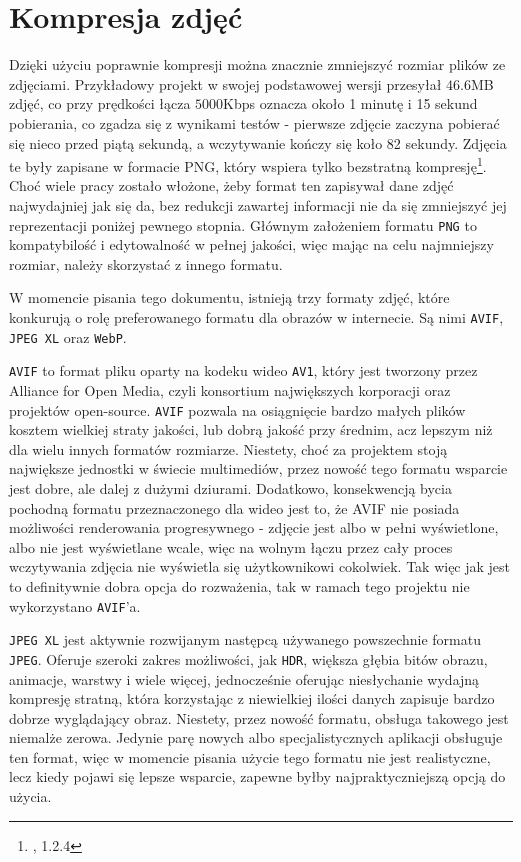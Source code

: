 \documentclass[licencjacka]{pracadypl}
\begin{document}
\section{Kompresja zdjęć}

Dzięki użyciu poprawnie kompresji można znacznie zmniejszyć rozmiar plików ze zdjęciami. Przykładowy projekt w swojej podstawowej wersji przesyłał $46.6$MB zdjęć, co przy prędkości łącza $5000$Kbps oznacza około 1 minutę i 15 sekund pobierania, co zgadza się z wynikami testów - pierwsze zdjęcie zaczyna pobierać się nieco przed piątą sekundą, a wczytywanie kończy się koło 82 sekundy. Zdjęcia te były zapisane w formacie PNG, który wspiera tylko bezstratną kompresję\footnote{\cite{png}, 1.2.4}. Choć wiele pracy zostało włożone, żeby format ten zapisywał dane zdjęć najwydajniej jak się da, bez redukcji zawartej informacji nie da się zmniejszyć jej reprezentacji poniżej pewnego stopnia. Głównym założeniem formatu \texttt{PNG} to kompatybilość i edytowalność w pełnej jakości, więc mając na celu najmniejszy rozmiar, należy skorzystać z innego formatu.

W momencie pisania tego dokumentu, istnieją trzy formaty zdjęć, które konkurują o rolę preferowanego formatu dla obrazów w internecie. Są nimi \texttt{AVIF}, \texttt{JPEG XL} oraz \texttt{WebP}. 

\texttt{AVIF} to format pliku oparty na kodeku wideo \texttt{AV1}, który jest tworzony przez Alliance for Open Media, czyli konsortium największych korporacji oraz projektów open-source. \texttt{AVIF} pozwala na osiągnięcie bardzo małych plików kosztem wielkiej straty jakości, lub dobrą jakość przy średnim, acz lepszym niż dla wielu innych formatów rozmiarze. Niestety, choć za projektem stoją największe jednostki w świecie multimediów, przez nowość tego formatu wsparcie jest dobre, ale dalej z dużymi dziurami. Dodatkowo, konsekwencją bycia pochodną formatu przeznaczonego dla wideo jest to, że AVIF nie posiada możliwości renderowania progresywnego - zdjęcie jest albo w pełni wyświetlone, albo nie jest wyświetlane wcale, więc na wolnym łączu przez cały proces wczytywania zdjęcia nie wyświetla się użytkownikowi cokolwiek. Tak więc jak jest to definitywnie dobra opcja do rozważenia, tak w ramach tego projektu nie wykorzystano \texttt{AVIF}'a.

\texttt{JPEG XL} jest aktywnie rozwijanym następcą używanego powszechnie formatu \texttt{JPEG}. Oferuje szeroki zakres możliwości, jak \texttt{HDR}, większa głębia bitów obrazu, animacje, warstwy i wiele więcej, jednocześnie oferując niesłychanie wydajną kompresję stratną, która korzystając z niewielkiej ilości danych zapisuje bardzo dobrze wyglądający obraz. Niestety, przez nowość formatu, obsługa takowego jest niemalże zerowa. Jedynie parę nowych albo specjalistycznych aplikacji obsługuje ten format, więc w momencie pisania użycie tego formatu nie jest realistyczne, lecz kiedy pojawi się lepsze wsparcie, zapewne byłby najpraktyczniejszą opcją do użycia.
\end{document}
